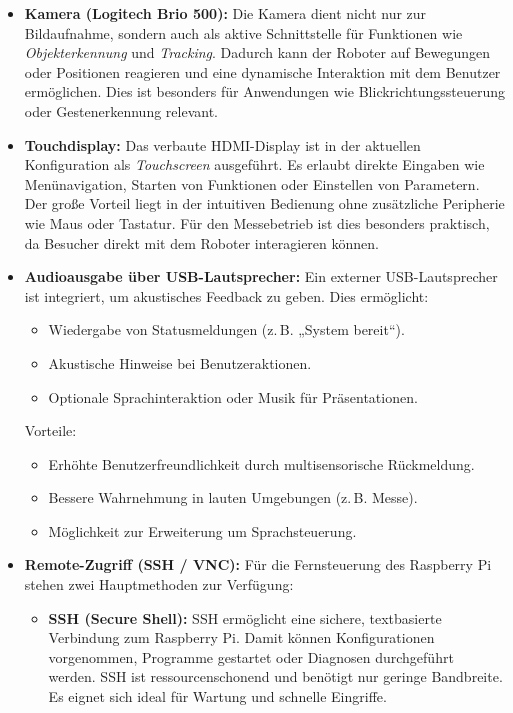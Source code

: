 \begin{itemize}
	\item \textbf{Kamera (Logitech Brio 500):} 
	Die Kamera dient nicht nur zur Bildaufnahme, sondern auch als aktive Schnittstelle für Funktionen wie \textit{Objekterkennung} und \textit{Tracking}. Dadurch kann der Roboter auf Bewegungen oder Positionen reagieren und eine dynamische Interaktion mit dem Benutzer ermöglichen. Dies ist besonders für Anwendungen wie Blickrichtungssteuerung oder Gestenerkennung relevant.
	
	\item \textbf{Touchdisplay:} 
	Das verbaute HDMI-Display ist in der aktuellen Konfiguration als \textit{Touchscreen} ausgeführt. Es erlaubt direkte Eingaben wie Menünavigation, Starten von Funktionen oder Einstellen von Parametern. Der große Vorteil liegt in der intuitiven Bedienung ohne zusätzliche Peripherie wie Maus oder Tastatur. Für den Messebetrieb ist dies besonders praktisch, da Besucher direkt mit dem Roboter interagieren können.
	
	\item \textbf{Audioausgabe über USB-Lautsprecher:} 
	Ein externer USB-Lautsprecher ist integriert, um akustisches Feedback zu geben. Dies ermöglicht:
	\begin{itemize}
		\item Wiedergabe von Statusmeldungen (z.\,B. „System bereit“).
		\item Akustische Hinweise bei Benutzeraktionen.
		\item Optionale Sprachinteraktion oder Musik für Präsentationen.
	\end{itemize}
	Vorteile:
	\begin{itemize}
		\item Erhöhte Benutzerfreundlichkeit durch multisensorische Rückmeldung.
		\item Bessere Wahrnehmung in lauten Umgebungen (z.\,B. Messe).
		\item Möglichkeit zur Erweiterung um Sprachsteuerung.
	\end{itemize}
	
	\item \textbf{Remote-Zugriff (SSH / VNC):} 
	Für die Fernsteuerung des Raspberry Pi stehen zwei Hauptmethoden zur Verfügung:
	\begin{itemize}
		\item \textbf{SSH (Secure Shell):} 
		SSH ermöglicht eine sichere, textbasierte Verbindung zum Raspberry Pi. Damit können Konfigurationen vorgenommen, Programme gestartet oder Diagnosen durchgeführt werden. SSH ist ressourcenschonend und benötigt nur geringe Bandbreite. Es eignet sich ideal für Wartung und schnelle Eingriffe.
		

\end{itemize}
\end{itemize}
